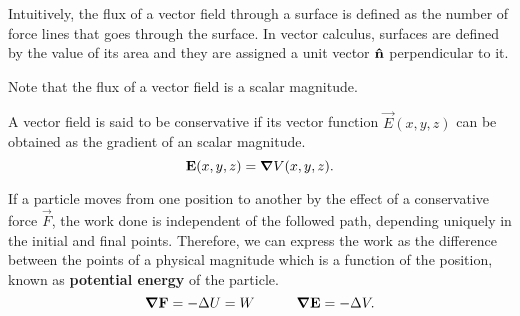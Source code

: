 Intuitively, the flux of a vector field through a surface is defined as the number of force lines that goes through the 
surface. In vector calculus, surfaces are defined by the value of its area and they are assigned a unit vector $\mathbf{\hat{n}}$
perpendicular to it.

\begin{remark}
    Note that the flux of a vector field is a scalar magnitude.
\end{remark}

\begin{defn}
    A vector field is said to be conservative if its vector function $\vec{E}(x, y, z)$ can be obtained as the gradient
    of an scalar magnitude. 
    \begin{equation}
        \mathbf{E}(x, y, z) = \grad V(x, y, z).
    \end{equation}
\end{defn}

If a particle moves from one position to another by the effect of a conservative force $\vec{F}$, the work done is 
independent of the followed path, depending uniquely in the initial and final points. Therefore, we can express the work
as the difference between the points of a physical magnitude which is a function of the position, known as \textbf{potential
energy} of the particle.
\begin{equation}
    \grad\mathbf{F} = -\Delta U = W\quad\quad\quad \grad\mathbf{E} = -\Delta V.
\end{equation}
